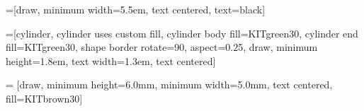 =[draw, minimum width=5.5em, text centered, 
	text=black]

=[cylinder, cylinder uses custom fill, cylinder body 
		fill=KITgreen30, cylinder end fill=KITgreen30, shape border rotate=90,
		aspect=0.25, draw, minimum height=1.8em, text width=1.3em, text centered]

 = [draw, minimum height=6.0mm, minimum width=5.0mm, 
    text centered, fill=KITbrown30] 



   
    

\makeatletter
{}
\makeatother

